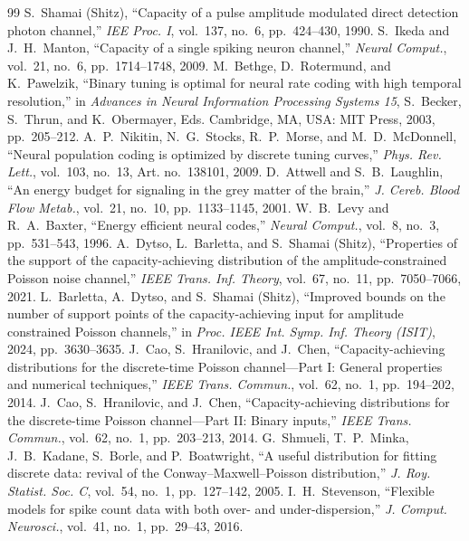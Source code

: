 \documentclass[journal]{IEEEtran}
\begin{document}
\FloatBarrier
\begin{thebibliography}{99}
 S.~Shamai (Shitz), ``Capacity of a pulse amplitude modulated direct detection photon channel,'' \emph{IEE Proc. I}, vol.~137, no.~6, pp.~424--430, 1990.
 S.~Ikeda and J.~H.~Manton, ``Capacity of a single spiking neuron channel,'' \emph{Neural Comput.}, vol.~21, no.~6, pp.~1714--1748, 2009.
 M.~Bethge, D.~Rotermund, and K.~Pawelzik, ``Binary tuning is optimal for neural rate coding with high temporal resolution,'' in \emph{Advances in Neural Information Processing Systems 15}, S.~Becker, S.~Thrun, and K.~Obermayer, Eds. Cambridge, MA, USA: MIT Press, 2003, pp.~205--212.%
 A.~P.~Nikitin, N.~G.~Stocks, R.~P.~Morse, and M.~D.~McDonnell, ``Neural population coding is optimized by discrete tuning curves,'' \emph{Phys. Rev. Lett.}, vol.~103, no.~13, Art. no.~138101, 2009.
 D.~Attwell and S.~B.~Laughlin, ``An energy budget for signaling in the grey matter of the brain,'' \emph{J. Cereb. Blood Flow Metab.}, vol.~21, no.~10, pp.~1133--1145, 2001.
 W.~B.~Levy and R.~A.~Baxter, ``Energy efficient neural codes,'' \emph{Neural Comput.}, vol.~8, no.~3, pp.~531--543, 1996.
 A.~Dytso, L.~Barletta, and S.~Shamai (Shitz), ``Properties of the support of the capacity-achieving distribution of the amplitude-constrained Poisson noise channel,'' \emph{IEEE Trans. Inf. Theory}, vol.~67, no.~11, pp.~7050--7066, 2021.
 L.~Barletta, A.~Dytso, and S.~Shamai (Shitz), ``Improved bounds on the number of support points of the capacity-achieving input for amplitude constrained Poisson channels,'' in \emph{Proc. IEEE Int. Symp. Inf. Theory (ISIT)}, 2024, pp.~3630--3635.
 J.~Cao, S.~Hranilovic, and J.~Chen, ``Capacity-achieving distributions for the discrete-time Poisson channel---Part I: General properties and numerical techniques,'' \emph{IEEE Trans. Commun.}, vol.~62, no.~1, pp.~194--202, 2014.
 J.~Cao, S.~Hranilovic, and J.~Chen, ``Capacity-achieving distributions for the discrete-time Poisson channel---Part II: Binary inputs,'' \emph{IEEE Trans. Commun.}, vol.~62, no.~1, pp.~203--213, 2014.%
 G.~Shmueli, T.~P.~Minka, J.~B.~Kadane, S.~Borle, and P.~Boatwright, ``A useful distribution for fitting discrete data: revival of the Conway--Maxwell--Poisson distribution,'' \emph{J. Roy. Statist. Soc. C}, vol.~54, no.~1, pp.~127--142, 2005.
 I.~H.~Stevenson, ``Flexible models for spike count data with both over- and under-dispersion,'' \emph{J. Comput. Neurosci.}, vol.~41, no.~1, pp.~29--43, 2016.%

\end{thebibliography}
\end{document}
